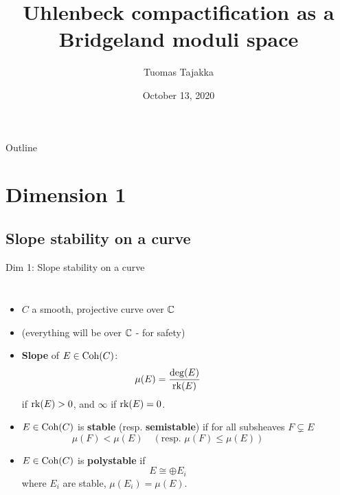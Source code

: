 \documentclass[8pt]{beamer} %
\title{Uhlenbeck compactification as a Bridgeland moduli space}
\author{Tuomas Tajakka}
\institute{University of Washington}
\date{October 13, 2020}
\begin{document}
\begin{frame}
    \titlepage
\end{frame}

\begin{frame}{Outline}
    \tableofcontents    
\end{frame}

\section{Dimension 1}
\subsection{Slope stability on a curve}
\begin{frame}[fragile]{Dim 1: Slope stability on a curve}
\begin{columns}[t]
    \begin{itemize}
        \item<2-> $C$ a smooth, projective curve over $\mathbb{C}$
        \item<3-> (everything will be over $\mathbb{C}$ - for safety)
        \item<4-> \textbf{Slope} of $E \in \mathrm{Coh}(C)$:
        \[ \mu(E) = \frac{\deg(E)}{\operatorname{\mathrm{rk}}(E)} \]
        if $\operatorname{\mathrm{rk}}(E) > 0$, and $\infty$ if $\operatorname{\mathrm{rk}}(E) = 0$.
        \item<5-> $E \in \mathrm{Coh}(C)$ is \textbf{stable} (resp. \textbf{semistable}) if for all subsheaves $F \subsetneq E$
        \[ \mu(F) < \mu(E) \quad (\text{resp. } \mu(F) \le \mu(E)) \]
        \item<6-> $E \in \mathrm{Coh}(C)$ is \textbf{polystable} if
        \[ E \cong \oplus E_i \]
        where $E_i$ are stable, $\mu(E_i) = \mu(E)$.
    \end{itemize}
    

\end{columns}
\end{frame}
\end{document}
